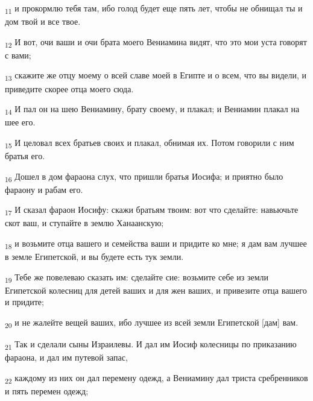 \begin{tcolorbox}
\textsubscript{11} и прокормлю тебя там, ибо голод будет еще пять лет, чтобы не обнищал ты и дом твой и все твое.
\end{tcolorbox}
\begin{tcolorbox}
\textsubscript{12} И вот, очи ваши и очи брата моего Вениамина видят, что это мои уста говорят с вами;
\end{tcolorbox}
\begin{tcolorbox}
\textsubscript{13} скажите же отцу моему о всей славе моей в Египте и о всем, что вы видели, и приведите скорее отца моего сюда.
\end{tcolorbox}
\begin{tcolorbox}
\textsubscript{14} И пал он на шею Вениамину, брату своему, и плакал; и Вениамин плакал на шее его.
\end{tcolorbox}
\begin{tcolorbox}
\textsubscript{15} И целовал всех братьев своих и плакал, обнимая их. Потом говорили с ним братья его.
\end{tcolorbox}
\begin{tcolorbox}
\textsubscript{16} Дошел в дом фараона слух, что пришли братья Иосифа; и приятно было фараону и рабам его.
\end{tcolorbox}
\begin{tcolorbox}
\textsubscript{17} И сказал фараон Иосифу: скажи братьям твоим: вот что сделайте: навьючьте скот ваш, и ступайте в землю Ханаанскую;
\end{tcolorbox}
\begin{tcolorbox}
\textsubscript{18} и возьмите отца вашего и семейства ваши и придите ко мне; я дам вам лучшее в земле Египетской, и вы будете есть тук земли.
\end{tcolorbox}
\begin{tcolorbox}
\textsubscript{19} Тебе же повелеваю сказать им: сделайте сие: возьмите себе из земли Египетской колесниц для детей ваших и для жен ваших, и привезите отца вашего и придите;
\end{tcolorbox}
\begin{tcolorbox}
\textsubscript{20} и не жалейте вещей ваших, ибо лучшее из всей земли Египетской [дам] вам.
\end{tcolorbox}
\begin{tcolorbox}
\textsubscript{21} Так и сделали сыны Израилевы. И дал им Иосиф колесницы по приказанию фараона, и дал им путевой запас,
\end{tcolorbox}
\begin{tcolorbox}
\textsubscript{22} каждому из них он дал перемену одежд, а Вениамину дал триста сребренников и пять перемен одежд;
\end{tcolorbox}
